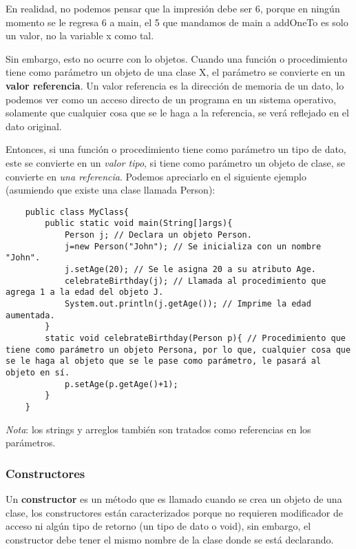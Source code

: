 En realidad, no podemos pensar que la impresión debe ser 6, porque en ningún momento se le regresa 6 a main, el 5 que mandamos de main a addOneTo es solo un valor, no la variable x como tal.

Sin embargo, esto no ocurre con lo objetos. Cuando una función o procedimiento tiene como parámetro un objeto de una clase X, el parámetro se convierte en un \textbf{valor referencia}. Un valor referencia es la dirección de memoria de un dato, lo podemos ver como un acceso directo de un programa en un sistema operativo, solamente que cualquier cosa que se le haga a la referencia, se verá reflejado en el dato original.

Entonces, si una función o procedimiento tiene como parámetro un tipo de dato, este se convierte en un \textit{valor tipo}, si tiene como parámetro un objeto de clase, se convierte en \textit{una referencia}. Podemos apreciarlo en el siguiente ejemplo (asumiendo que existe una clase llamada Person):
\begin{lstlisting}
    public class MyClass{
        public static void main(String[]args){
            Person j; // Declara un objeto Person.
            j=new Person("John"); // Se inicializa con un nombre "John".
            j.setAge(20); // Se le asigna 20 a su atributo Age.
            celebrateBirthday(j); // Llamada al procedimiento que agrega 1 a la edad del objeto J.
            System.out.println(j.getAge()); // Imprime la edad aumentada.
        }
        static void celebrateBirthday(Person p){ // Procedimiento que tiene como parámetro un objeto Persona, por lo que, cualquier cosa que se le haga al objeto que se le pase como parámetro, le pasará al objeto en sí.
            p.setAge(p.getAge()+1);
        }
    }
\end{lstlisting}

\textit{Nota}: los strings y arreglos también son tratados como referencias en los parámetros.


\subsubsection{Constructores}

Un \textbf{constructor} es un método que es llamado cuando se crea un objeto de una clase, los constructores están caracterizados porque no requieren modificador de acceso ni algún tipo de retorno (un tipo de dato o void), sin embargo, el constructor debe tener el mismo nombre de la clase donde se está declarando.

